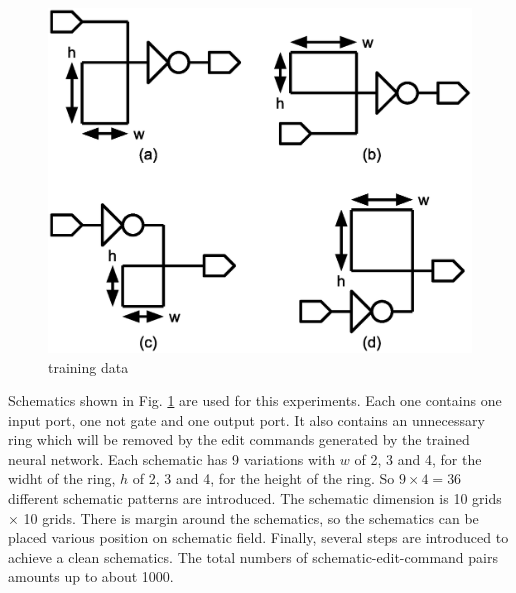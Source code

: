 \documentclass[twocolumn]{article}
\begin{document}
\begin{figure}[!tp]
 \begin{center}
  \begin{minipage}{\hsize}
   \includegraphics[width=\hsize]{fig/training_data_01.eps}
   \caption{training data}
   \label{fig:training_data}
  \end{minipage}
 \end{center}
\end{figure}

Schematics shown in Fig. \ref{fig:training_data} are used for this experiments.
Each one contains one input port, one not gate and one output port.
It also contains an unnecessary ring which will be removed
by the edit commands generated by the trained neural network.
Each schematic has 9 variations with
$w$ of 2, 3 and 4, for the widht of the ring,
$h$ of 2, 3 and 4, for the height of the ring.
So $9 \times 4 = 36$ different schematic patterns are introduced.
The schematic dimension is 10 grids $\times$ 10 grids.
There is margin around the schematics,
so the schematics can be placed various position on schematic field.
Finally, several steps are introduced to achieve a clean schematics.
The total numbers of schematic-edit-command pairs amounts up to about 1000.
\end{document}
